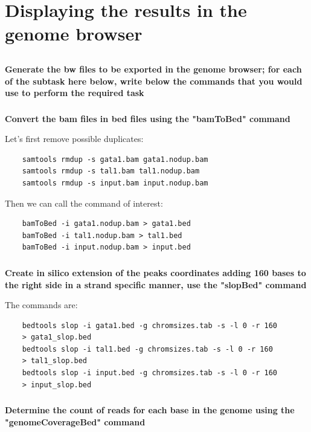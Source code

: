 \documentclass[12pt, a4paper]{article}
\begin{document}
	\section{Displaying the results in the genome browser}
	
	\subsection{}
	\textbf{Generate the bw files to be exported in the genome browser; for each of the subtask here below, write below the commands that you would use to perform the required task}
	
	\subsubsection{}
	\textbf{Convert the bam files in bed files using the "bamToBed" command}
	
	Let's first remove possible duplicates:
	
	\begin{verbatim}
	samtools rmdup -s gata1.bam gata1.nodup.bam
	samtools rmdup -s tal1.bam tal1.nodup.bam
	samtools rmdup -s input.bam input.nodup.bam
	\end{verbatim}
	
	Then we can call the command of interest:
	
	\begin{verbatim}
	bamToBed -i gata1.nodup.bam > gata1.bed
	bamToBed -i tal1.nodup.bam > tal1.bed
	bamToBed -i input.nodup.bam > input.bed
	\end{verbatim}
	
	\subsubsection{}
	\textbf{Create in silico extension of the peaks coordinates adding 160 bases to the right side in a strand specific manner, use the "slopBed" command}
	
	The commands are:
	
	\begin{verbatim}
	bedtools slop -i gata1.bed -g chromsizes.tab -s -l 0 -r 160
	> gata1_slop.bed
	bedtools slop -i tal1.bed -g chromsizes.tab -s -l 0 -r 160
	> tal1_slop.bed
	bedtools slop -i input.bed -g chromsizes.tab -s -l 0 -r 160
	> input_slop.bed
	\end{verbatim}
	
	\subsubsection{}
	\textbf{Determine the count of reads for each base in the genome using the "genomeCoverageBed" command}
	
\end{document}

